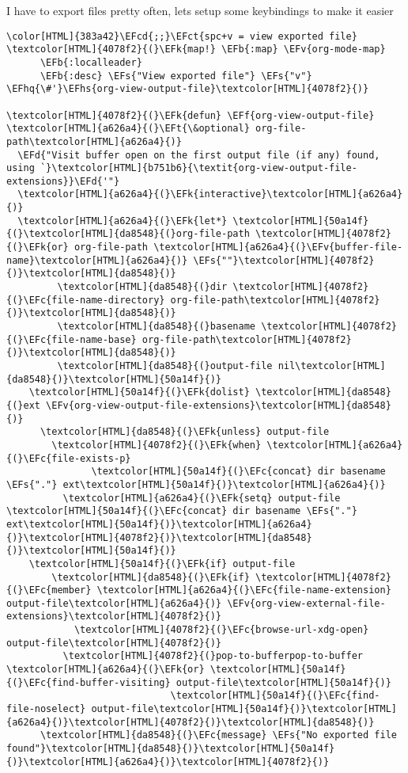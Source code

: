 \documentclass{scrartcl}
\newcommand{\EFk}[1]{\textcolor{EFk}{#1}} %
\newcommand{\EFd}[1]{\textcolor{EFd}{\textit{#1}}} %
\newcommand{\EFt}[1]{\textcolor{EFt}{#1}} %
\newcommand{\EFs}[1]{\textcolor{EFs}{#1}} %
\newcommand{\EFb}[1]{\textcolor{EFb}{#1}} %
\newcommand{\EFct}[1]{\textcolor{EFct}{#1}} %
\newcommand{\EFc}[1]{\textcolor{EFc}{#1}} %
\newcommand{\EFv}[1]{\textcolor{EFv}{#1}} %
\newcommand{\EFf}[1]{\textcolor{EFf}{#1}} %
\newcommand{\EFcd}[1]{\textcolor{EFcd}{#1}} %
\newcommand{\EFhq}[1]{\textcolor{EFhq}{#1}} %
\newcommand{\EFhs}[1]{\textcolor{EFhs}{#1}} %
\begin{document}
I have to export files pretty often, lets setup some keybindings to make it easier
\begin{Code}
\begin{Verbatim}[]
\color[HTML]{383a42}\EFcd{;;}\EFct{spc+v = view exported file}
\textcolor[HTML]{4078f2}{(}\EFk{map!} \EFb{:map} \EFv{org-mode-map}
      \EFb{:localleader}
      \EFb{:desc} \EFs{"View exported file"} \EFs{"v"} \EFhq{\#'}\EFhs{org-view-output-file}\textcolor[HTML]{4078f2}{)}

\textcolor[HTML]{4078f2}{(}\EFk{defun} \EFf{org-view-output-file} \textcolor[HTML]{a626a4}{(}\EFt{\&optional} org-file-path\textcolor[HTML]{a626a4}{)}
  \EFd{"Visit buffer open on the first output file (if any) found, using `}\textcolor[HTML]{b751b6}{\textit{org-view-output-file-extensions}}\EFd{'"}
  \textcolor[HTML]{a626a4}{(}\EFk{interactive}\textcolor[HTML]{a626a4}{)}
  \textcolor[HTML]{a626a4}{(}\EFk{let*} \textcolor[HTML]{50a14f}{(}\textcolor[HTML]{da8548}{(}org-file-path \textcolor[HTML]{4078f2}{(}\EFk{or} org-file-path \textcolor[HTML]{a626a4}{(}\EFv{buffer-file-name}\textcolor[HTML]{a626a4}{)} \EFs{""}\textcolor[HTML]{4078f2}{)}\textcolor[HTML]{da8548}{)}
         \textcolor[HTML]{da8548}{(}dir \textcolor[HTML]{4078f2}{(}\EFc{file-name-directory} org-file-path\textcolor[HTML]{4078f2}{)}\textcolor[HTML]{da8548}{)}
         \textcolor[HTML]{da8548}{(}basename \textcolor[HTML]{4078f2}{(}\EFc{file-name-base} org-file-path\textcolor[HTML]{4078f2}{)}\textcolor[HTML]{da8548}{)}
         \textcolor[HTML]{da8548}{(}output-file nil\textcolor[HTML]{da8548}{)}\textcolor[HTML]{50a14f}{)}
    \textcolor[HTML]{50a14f}{(}\EFk{dolist} \textcolor[HTML]{da8548}{(}ext \EFv{org-view-output-file-extensions}\textcolor[HTML]{da8548}{)}
      \textcolor[HTML]{da8548}{(}\EFk{unless} output-file
        \textcolor[HTML]{4078f2}{(}\EFk{when} \textcolor[HTML]{a626a4}{(}\EFc{file-exists-p}
               \textcolor[HTML]{50a14f}{(}\EFc{concat} dir basename \EFs{"."} ext\textcolor[HTML]{50a14f}{)}\textcolor[HTML]{a626a4}{)}
          \textcolor[HTML]{a626a4}{(}\EFk{setq} output-file \textcolor[HTML]{50a14f}{(}\EFc{concat} dir basename \EFs{"."} ext\textcolor[HTML]{50a14f}{)}\textcolor[HTML]{a626a4}{)}\textcolor[HTML]{4078f2}{)}\textcolor[HTML]{da8548}{)}\textcolor[HTML]{50a14f}{)}
    \textcolor[HTML]{50a14f}{(}\EFk{if} output-file
        \textcolor[HTML]{da8548}{(}\EFk{if} \textcolor[HTML]{4078f2}{(}\EFc{member} \textcolor[HTML]{a626a4}{(}\EFc{file-name-extension} output-file\textcolor[HTML]{a626a4}{)} \EFv{org-view-external-file-extensions}\textcolor[HTML]{4078f2}{)}
            \textcolor[HTML]{4078f2}{(}\EFc{browse-url-xdg-open} output-file\textcolor[HTML]{4078f2}{)}
          \textcolor[HTML]{4078f2}{(}pop-to-bufferpop-to-buffer \textcolor[HTML]{a626a4}{(}\EFk{or} \textcolor[HTML]{50a14f}{(}\EFc{find-buffer-visiting} output-file\textcolor[HTML]{50a14f}{)}
                             \textcolor[HTML]{50a14f}{(}\EFc{find-file-noselect} output-file\textcolor[HTML]{50a14f}{)}\textcolor[HTML]{a626a4}{)}\textcolor[HTML]{4078f2}{)}\textcolor[HTML]{da8548}{)}
      \textcolor[HTML]{da8548}{(}\EFc{message} \EFs{"No exported file found"}\textcolor[HTML]{da8548}{)}\textcolor[HTML]{50a14f}{)}\textcolor[HTML]{a626a4}{)}\textcolor[HTML]{4078f2}{)}


\end{Verbatim}
\end{Code}
\end{document}
